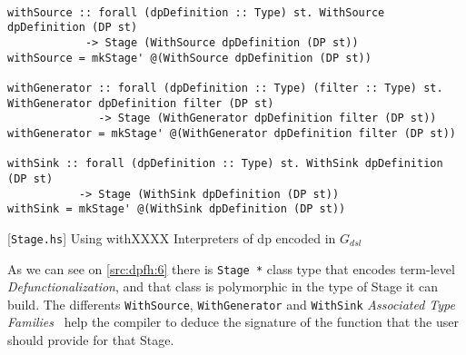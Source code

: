 \begin{listing}[H]
  \begin{verbatim}

withSource :: forall (dpDefinition :: Type) st. WithSource dpDefinition (DP st) 
            -> Stage (WithSource dpDefinition (DP st))
withSource = mkStage' @(WithSource dpDefinition (DP st))

withGenerator :: forall (dpDefinition :: Type) (filter :: Type) st. WithGenerator dpDefinition filter (DP st) 
              -> Stage (WithGenerator dpDefinition filter (DP st))
withGenerator = mkStage' @(WithGenerator dpDefinition filter (DP st))

withSink :: forall (dpDefinition :: Type) st. WithSink dpDefinition (DP st) 
           -> Stage (WithSink dpDefinition (DP st))
withSink = mkStage' @(WithSink dpDefinition (DP st))
  \end{verbatim}
  \caption{[\texttt{Stage.hs}] Using withXXXX Interpreters of \acrshort{dp} encoded in $G_{dsl}$}
  \label{src:dpfh:6}
\end{listing}

As we can see on \autoref{src:dpfh:6} there is \texttt{Stage *} class type that encodes term-level \emph{Defunctionalization}, and that class is polymorphic in the type of Stage it can build.
The differents \texttt{WithSource}, \texttt{WithGenerator} and \texttt{WithSink}
\emph{Associated Type Families}~\cite{associated-types} help the compiler to deduce the signature of the function that the user should provide for that Stage.


